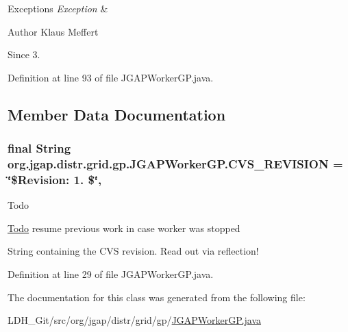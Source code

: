 \begin{DoxyExceptions}{Exceptions}
{\em Exception} & \\
\hline
\end{DoxyExceptions}
\begin{DoxyAuthor}{Author}
Klaus Meffert 
\end{DoxyAuthor}
\begin{DoxySince}{Since}
3. 
\end{DoxySince}


Definition at line 93 of file J\-G\-A\-P\-Worker\-G\-P.\-java.



\subsection{Member Data Documentation}
\hypertarget{classorg_1_1jgap_1_1distr_1_1grid_1_1gp_1_1_j_g_a_p_worker_g_p_a793842b038b3f6e753208dcc0d9f8d9f}{
\subsubsection[{C\-V\-S\-\_\-\-R\-E\-V\-I\-S\-I\-O\-N}]{\setlength{\rightskip}{0pt plus 5cm}final String org.\-jgap.\-distr.\-grid.\-gp.\-J\-G\-A\-P\-Worker\-G\-P.\-C\-V\-S\-\_\-\-R\-E\-V\-I\-S\-I\-O\-N = \char`\"{}\$Revision\-: 1. \$\char`\"{}\hspace{0.3cm}{\ttfamily [static]}, {\ttfamily [private]}}}\label{classorg_1_1jgap_1_1distr_1_1grid_1_1gp_1_1_j_g_a_p_worker_g_p_a793842b038b3f6e753208dcc0d9f8d9f}
\begin{DoxyRefDesc}{Todo}
\item[\hyperlink{todo__todo000094}{Todo}]resume previous work in case worker was stopped \end{DoxyRefDesc}
String containing the C\-V\-S revision. Read out via reflection! 

Definition at line 29 of file J\-G\-A\-P\-Worker\-G\-P.\-java.



The documentation for this class was generated from the following file\-:\begin{DoxyCompactItemize}
\item 
L\-D\-H\-\_\-\-Git/src/org/jgap/distr/grid/gp/\hyperlink{_j_g_a_p_worker_g_p_8java}{J\-G\-A\-P\-Worker\-G\-P.\-java}\end{DoxyCompactItemize}
